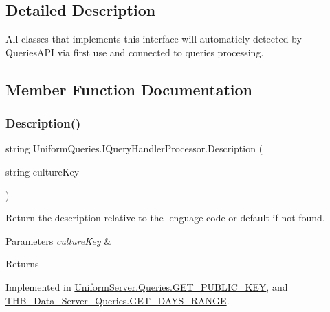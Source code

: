 \subsection{Detailed Description}
All classes that implements this interface will automaticly detected by Queries\+A\+PI via first use and connected to queries processing. 



\subsection{Member Function Documentation}
\mbox{\label{interface_uniform_queries_1_1_i_query_handler_processor_ae7323367177cd11c787d61029de5b044}} 
\subsubsection{\texorpdfstring{Description()}{Description()}}
{\footnotesize\ttfamily string Uniform\+Queries.\+I\+Query\+Handler\+Processor.\+Description (\begin{DoxyParamCaption}\item[{string}]{culture\+Key }\end{DoxyParamCaption})}



Return the description relative to the lenguage code or default if not found. 


\begin{DoxyParams}{Parameters}
{\em culture\+Key} & \\
\hline
\end{DoxyParams}
\begin{DoxyReturn}{Returns}

\end{DoxyReturn}


Implemented in \mbox{\hyperlink{class_uniform_server_1_1_queries_1_1_g_e_t___p_u_b_l_i_c___k_e_y_aee414e6882494609ed576f061d662dc2}{Uniform\+Server.\+Queries.\+G\+E\+T\+\_\+\+P\+U\+B\+L\+I\+C\+\_\+\+K\+EY}}, and \mbox{\hyperlink{class_t_h_b___data___server___queries_1_1_g_e_t___d_a_y_s___r_a_n_g_e_aa91ce7c90a325c70aab9aaf112fe49f3}{T\+H\+B\+\_\+\+Data\+\_\+\+Server\+\_\+\+Queries.\+G\+E\+T\+\_\+\+D\+A\+Y\+S\+\_\+\+R\+A\+N\+GE}}.

